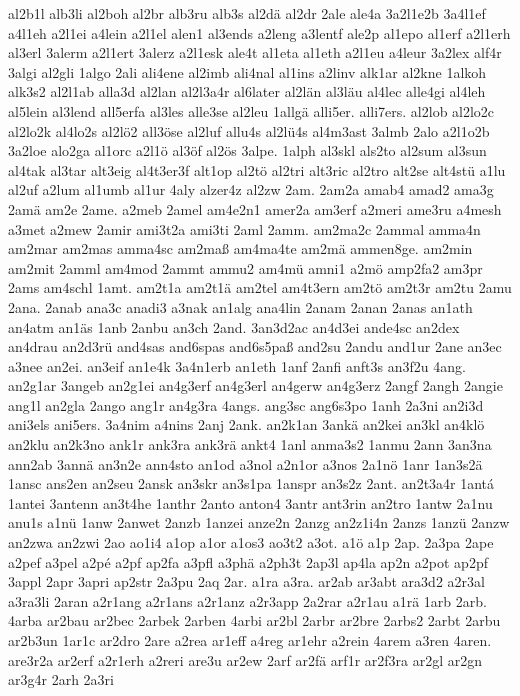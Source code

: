 {al2b1l
alb3li
al2boh
al2br
alb3ru
alb3s
al2dä
al2dr
2ale
ale4a
3a2l1e2b
3a4l1ef
a4l1eh
a2l1ei
a4lein
a2l1el
alen1
al3ends
a2leng
a3lentf
ale2p
al1epo
al1erf
a2l1erh
al3erl
3alerm
a2l1ert
3alerz
a2l1esk
ale4t
al1eta
al1eth
a2l1eu
a4leur
3a2lex
alf4r
3algi
al2gli
1algo
2ali
ali4ene
al2imb
ali4nal
al1ins
a2linv
alk1ar
al2kne
1alkoh
alk3s2
al2l1ab
alla3d
al2lan
al2l3a4r
al6later
al2län
al3läu
al4lec
alle4gi
al4leh
al5lein
al3lend
all5erfa
al3les
alle3se
al2leu
1allgä
alli5er.
alli7ers.
al2lob
al2lo2c
al2lo2k
al4lo2s
al2lö2
all3öse
al2luf
allu4s
al2lü4s
al4m3ast
3almb
2alo
a2l1o2b
3a2loe
alo2ga
al1orc
a2l1ö
al3öf
al2ös
3alpe.
1alph
al3skl
als2to
al2sum
al3sun
al4tak
al3tar
alt3eig
al4t3er3f
alt1op
al2tö
al2tri
alt3ric
al2tro
alt2se
alt4stü
a1lu
al2uf
a2lum
al1umb
al1ur
4aly
alzer4z
al2zw
2am.
2am2a
amab4
amad2
ama3g
2amä
am2e
2ame.
a2meb
2amel
am4e2n1
amer2a
am3erf
a2meri
ame3ru
a4mesh
a3met
a2mew
2amir
ami3t2a
ami3ti
2aml
2amm.
am2ma2c
2ammal
amma4n
am2mar
am2mas
amma4sc
am2maß
am4ma4te
am2mä
ammen8ge.
am2min
am2mit
2amml
am4mod
2ammt
ammu2
am4mü
amni1
a2mö
amp2fa2
am3pr
2ams
am4schl
1amt.
am2t1a
am2t1ä
am2tel
am4t3ern
am2tö
am2t3r
am2tu
2amu
2ana.
2anab
ana3c
anadi3
a3nak
an1alg
ana4lin
2anam
2anan
2anas
an1ath
an4atm
an1äs
1anb
2anbu
an3ch
2and.
3an3d2ac
an4d3ei
ande4sc
an2dex
an4drau
an2d3rü
and4sas
and6spas
and6s5paß
and2su
2andu
and1ur
2ane
an3ec
a3nee
an2ei.
an3eif
an1e4k
3a4n1erb
an1eth
1anf
2anfi
anft3s
an3f2u
4ang.
an2g1ar
3angeb
an2g1ei
an4g3erf
an4g3erl
an4gerw
an4g3erz
2angf
2angh
2angie
ang1l
an2gla
2ango
ang1r
an4g3ra
4angs.
ang3sc
ang6s3po
1anh
2a3ni
an2i3d
ani3els
ani5ers.
3a4nim
a4nins
2anj
2ank.
an2k1an
3ankä
an2kei
an3kl
an4klö
an2klu
an2k3no
ank1r
ank3ra
ank3rä
ankt4
1anl
anma3s2
1anmu
2ann
3an3na
ann2ab
3annä
an3n2e
ann4sto
an1od
a3nol
a2n1or
a3nos
2a1nö
1anr
1an3s2ä
1ansc
ans2en
an2seu
2ansk
an3skr
an3s1pa
1anspr
an3s2z
2ant.
an2t3a4r
1antá
1antei
3antenn
an3t4he
1anthr
2anto
anton4
3antr
ant3rin
an2tro
1antw
2a1nu
anu1s
a1nü
1anw
2anwet
2anzb
1anzei
anze2n
2anzg
an2z1i4n
2anzs
1anzü
2anzw
an2zwa
an2zwi
2ao
ao1i4
a1op
a1or
a1os3
ao3t2
a3ot.
a1ö
a1p
2ap.
2a3pa
2ape
a2pef
a3pel
a2pé
a2pf
ap2fa
a3pfl
a3phä
a2ph3t
2ap3l
ap4la
ap2n
a2pot
ap2pf
3appl
2apr
3apri
ap2str
2a3pu
2aq
2ar.
a1ra
a3ra.
ar2ab
ar3abt
ara3d2
a2r3al
a3ra3li
2aran
a2r1ang
a2r1ans
a2r1anz
a2r3app
2a2rar
a2r1au
a1rä
1arb
2arb.
4arba
ar2bau
ar2bec
2arbek
2arben
4arbi
ar2bl
2arbr
ar2bre
2arbs2
2arbt
2arbu
ar2b3un
1ar1c
ar2dro
2are
a2rea
ar1eff
a4reg
ar1ehr
a2rein
4arem
a3ren
4aren.
are3r2a
ar2erf
a2r1erh
a2reri
are3u
ar2ew
2arf
ar2fä
arf1r
ar2f3ra
ar2gl
ar2gn
ar3g4r
2arh
2a3ri
}

